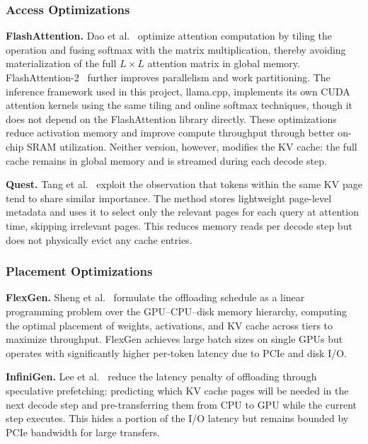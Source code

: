 \documentclass[
english,                 %
bibtex,                  %
]{kththesis}
\numberwithin{listing}{chapter}
\begin{document}
\subsubsection*{Access Optimizations}
\textbf{FlashAttention.} Dao et al.~\cite{dao2022flashattention} optimize attention computation by tiling the operation and fusing softmax with the matrix multiplication, thereby avoiding materialization of the full $L \times L$ attention matrix in global memory. FlashAttention-2~\cite{dao2023flashattention2} further improves parallelism and work partitioning. The inference framework used in this project, llama.cpp, implements its own \gls{CUDA} attention kernels using the same tiling and online softmax techniques, though it does not depend on the FlashAttention library directly. These optimizations reduce activation memory and improve compute throughput through better on-chip SRAM utilization. Neither version, however, modifies the \gls{KV} cache: the full cache remains in global memory and is streamed during each decode step.

\textbf{Quest.} Tang et al.~\cite{tang2024quest} exploit the observation that tokens within the same \gls{KV} page tend to share similar importance. The method stores lightweight page-level metadata and uses it to select only the relevant pages for each query at attention time, skipping irrelevant pages. This reduces memory reads per decode step but does not physically evict any cache entries.

\subsubsection*{Placement Optimizations}

\textbf{FlexGen.} Sheng et al.~\cite{sheng2023flexgen} formulate the offloading schedule as a linear programming problem over the \gls{GPU}--\gls{CPU}--disk memory hierarchy, computing the optimal placement of weights, activations, and \gls{KV} cache across tiers to maximize throughput. FlexGen achieves large batch sizes on single \glspl{GPU} but operates with significantly higher per-token latency due to PCIe and disk I/O.

\textbf{InfiniGen.} Lee et al.~\cite{lee2024infinigen} reduce the latency penalty of offloading through speculative prefetching: predicting which \gls{KV} cache pages will be needed in the next decode step and pre-transferring them from \gls{CPU} to \gls{GPU} while the current step executes. This hides a portion of the I/O latency but remains bounded by PCIe bandwidth for large transfers.
\end{document}
